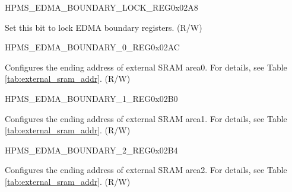 \begin{register}{H}{PMS\_EDMA\_BOUNDARY\_LOCK\_REG}{0x{}02A8}\label{regdesc:PMSEDMABOUNDARYLOCKREG}
%
%
\regnewline%
\begin{regdesc}\begin{reglist}
\label{fielddesc:PMSEDMABOUNDARYLOCK}\item [PMS\_EDMA\_BOUNDARY\_LOCK] Set this bit to lock EDMA boundary registers. (R/W)
\end{reglist}\end{regdesc}
\end{register}


\begin{register}{H}{PMS\_EDMA\_BOUNDARY\_0\_REG}{0x{}02AC}\label{regdesc:PMSEDMABOUNDARY0REG}
%
%
\regnewline%
\begin{regdesc}\begin{reglist}
\label{fielddesc:PMSEDMABOUNDARY0}\item [PMS\_EDMA\_BOUNDARY\_0] Configures the ending address of external SRAM area0. For details, see Table \ref{tab:external_sram_addr}. (R/W)
\end{reglist}\end{regdesc}
\end{register}


\begin{register}{H}{PMS\_EDMA\_BOUNDARY\_1\_REG}{0x{}02B0}\label{regdesc:PMSEDMABOUNDARY1REG}
%
%
\regnewline%
\begin{regdesc}\begin{reglist}
\label{fielddesc:PMSEDMABOUNDARY1}\item [PMS\_EDMA\_BOUNDARY\_1] Configures the ending address of external SRAM area1. For details, see Table \ref{tab:external_sram_addr}. (R/W)
\end{reglist}\end{regdesc}
\end{register}


\begin{register}{H}{PMS\_EDMA\_BOUNDARY\_2\_REG}{0x{}02B4}\label{regdesc:PMSEDMABOUNDARY2REG}
%
%
\regnewline%
\begin{regdesc}\begin{reglist}
\label{fielddesc:PMSEDMABOUNDARY2}\item [PMS\_EDMA\_BOUNDARY\_2] Configures the ending address of external SRAM area2. For details, see Table \ref{tab:external_sram_addr}. (R/W)
\end{reglist}\end{regdesc}
\end{register}



